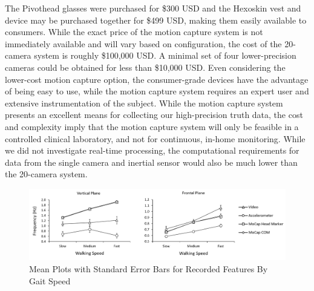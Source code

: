 \documentclass[12pt]{report}
\begin{document}
The Pivothead glasses were purchased for \$300 USD and the Hexoskin vest and device may be purchased together for \$499 USD, making them easily available to consumers. While the exact price of the motion capture system is not immediately available and will vary based on configuration, the cost of the 20-camera system is roughly \$100,000 USD. A minimal set of four lower-precision cameras could be obtained for less than \$10,000 USD. Even considering the lower-cost motion capture option, the consumer-grade devices have the advantage of being easy to use, while the motion capture system requires an expert user and extensive instrumentation of the subject. While the motion capture system presents an excellent means for collecting our high-precision truth data, the cost and complexity imply that the motion capture system will only be feasible in a controlled clinical laboratory, and not for continuous, in-home monitoring. While we did not investigate real-time processing, the computational requirements for data from the single camera and inertial sensor would also be much lower than the 20-camera system.

\begin{figure}[]
\centering
\includegraphics[width=7in]{figure/meanplots}
\caption{Mean Plots with Standard Error Bars for Recorded Features By Gait Speed}
\label{fig_meanPlots}
\end{figure}
\end{document}
